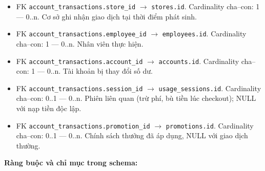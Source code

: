 \begin{itemize}

\item FK \texttt{account\_transactions.store\_id} $\rightarrow$ \texttt{stores.id}. Cardinality cha--con: 1 — 0..n. Cơ sở ghi nhận giao dịch tại thời điểm phát sinh.

\item FK \texttt{account\_transactions.employee\_id} $\rightarrow$ \texttt{employees.id}. Cardinality cha--con: 1 — 0..n. Nhân viên thực hiện.

\item FK \texttt{account\_transactions.account\_id} $\rightarrow$ \texttt{accounts.id}. Cardinality cha--con: 1 — 0..n. Tài khoản bị thay đổi số dư.

\item FK \texttt{account\_transactions.session\_id} $\rightarrow$ \texttt{usage\_sessions.id}. Cardinality cha--con: 0..1 — 0..n. Phiên liên quan (trừ phí, bù tiền lúc checkout); NULL với nạp tiền độc lập.

\item FK \texttt{account\_transactions.promotion\_id} $\rightarrow$ \texttt{promotions.id}. Cardinality cha--con: 0..1 — 0..n. Chính sách thưởng đã áp dụng, NULL với giao dịch thường.

\end{itemize}

\textbf{Ràng buộc và chỉ mục trong schema:}

